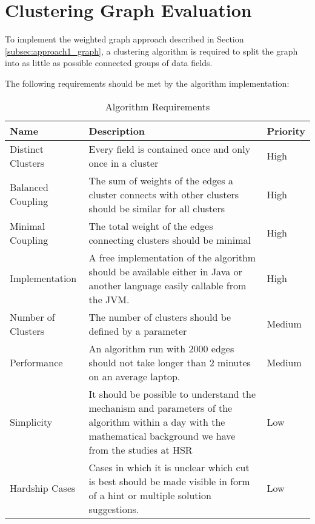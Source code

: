 \chapter{Clustering Graph Evaluation}
\label{appendix:graphClustering}

To implement the weighted graph approach described in Section \ref{subsec:approach1_graph}, a clustering algorithm is required to split the graph into as little as possible connected groups of data fields. 

The following requirements should be met by the algorithm implementation:

\begin{table}[H]
	\centering
	\caption{Algorithm Requirements}
	\label{tab:requirementsAlgorithm}
	\begin{tabular}{|p{100pt}|p{250pt}|p{50pt}|}
		\hline	
		Name & Description & Priority \\
		\hline
		Distinct Clusters & Every field is contained once and only once in a cluster & High  \\
		\hline
		Balanced Coupling & The sum of weights of the edges a cluster connects with other clusters should be similar for all clusters & High \\
		\hline
		Minimal Coupling & The total weight of the edges connecting clusters should be minimal & High \\
		\hline
		Implementation & A free implementation of the algorithm should be available either in Java or another language easily callable from the \gls{JVM}. & High  \\
		\hline
		Number of Clusters & The number of clusters should be defined by a parameter & Medium \\
		\hline
		Performance & An algorithm run with 2000 edges should not take longer than 2 minutes on an average laptop. & Medium \\
		\hline
		Simplicity & It should be possible to understand the mechanism and parameters of the algorithm within a day with the mathematical background we have from the studies at \gls{HSR} & Low \\
		\hline
		Hardship Cases & Cases in which it is unclear which cut is best should be made visible in form of a hint or multiple solution suggestions. & Low \\
		\hline
	\end{tabular}
\end{table}
